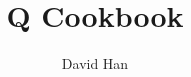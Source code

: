 \documentclass[a4paper,twoside]{scrbook}
\begin{document}
\title{Q Cookbook}
\author{David Han}
\frontmatter
\maketitle
\setcounter{tocdepth}{1}
\tableofcontents
\mainmatter







\end{document}
